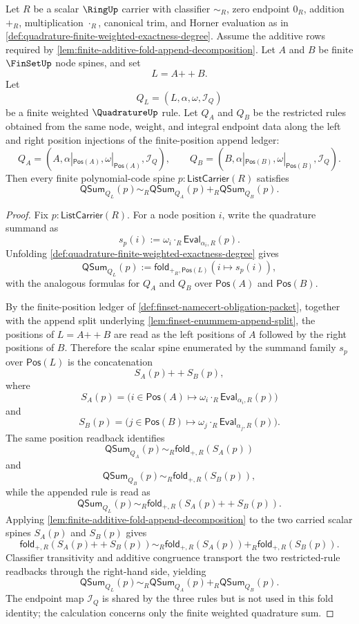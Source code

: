\begin{theorem}
\label{thm:quadrature-node-list-append-sum-decomposition}
Let $R$ be a scalar $\RingUp$ carrier with classifier $\sim_R$, zero endpoint $0_R$, addition $+_R$, multiplication $\cdot_R$, canonical trim, and Horner evaluation as in \autoref{def:quadrature-finite-weighted-exactness-degree}. Assume the additive rows required by \autoref{lem:finite-additive-fold-append-decomposition}. Let $A$ and $B$ be finite $\FinSetUp$ node spines, and set
$$
L=A{++}B.
$$
Let
$$
Q_L=(L,\alpha,\omega,\mathcal I_Q)
$$
be a finite weighted $\QuadratureUp$ rule. Let $Q_A$ and $Q_B$ be the restricted rules obtained from the same node, weight, and integral endpoint data along the left and right position injections of the finite-position append ledger:
$$
Q_A=(A,\alpha|_{\mathsf{Pos}(A)},\omega|_{\mathsf{Pos}(A)},\mathcal I_Q),
\qquad
Q_B=(B,\alpha|_{\mathsf{Pos}(B)},\omega|_{\mathsf{Pos}(B)},\mathcal I_Q).
$$
Then every finite polynomial-code spine $p:\mathsf{ListCarrier}(R)$ satisfies
$$
\mathsf{QSum}_{Q_L}(p)
\sim_R
\mathsf{QSum}_{Q_A}(p)+_R\mathsf{QSum}_{Q_B}(p).
$$
\end{theorem}
\begin{proof}
Fix $p:\mathsf{ListCarrier}(R)$. For a node position $i$, write the quadrature summand as
$$
s_p(i):=\omega_i\cdot_R\mathsf{Eval}_{\alpha_i,R}(p).
$$
Unfolding \autoref{def:quadrature-finite-weighted-exactness-degree} gives
$$
\mathsf{QSum}_{Q_L}(p)
:=
\mathsf{fold}_{+_R,\mathsf{Pos}(L)}(i\mapsto s_p(i)),
$$
with the analogous formulas for $Q_A$ and $Q_B$ over $\mathsf{Pos}(A)$ and $\mathsf{Pos}(B)$.

By the finite-position ledger of \autoref{def:finset-namecert-obligation-packet}, together with the append split underlying \autoref{lem:finset-enummem-append-split}, the positions of $L=A{++}B$ are read as the left positions of $A$ followed by the right positions of $B$. Therefore the scalar spine enumerated by the summand family $s_p$ over $\mathsf{Pos}(L)$ is the concatenation
$$
S_A(p){++}S_B(p),
$$
where
$$
S_A(p)=\bigl(i\in\mathsf{Pos}(A)\mapsto
\omega_i\cdot_R\mathsf{Eval}_{\alpha_i,R}(p)\bigr)
$$
and
$$
S_B(p)=\bigl(j\in\mathsf{Pos}(B)\mapsto
\omega_j\cdot_R\mathsf{Eval}_{\alpha_j,R}(p)\bigr).
$$
The same position readback identifies
$$
\mathsf{QSum}_{Q_A}(p)
\sim_R
\mathsf{fold}_{+,R}(S_A(p))
$$
and
$$
\mathsf{QSum}_{Q_B}(p)
\sim_R
\mathsf{fold}_{+,R}(S_B(p)),
$$
while the appended rule is read as
$$
\mathsf{QSum}_{Q_L}(p)
\sim_R
\mathsf{fold}_{+,R}(S_A(p){++}S_B(p)).
$$
Applying \autoref{lem:finite-additive-fold-append-decomposition} to the two carried scalar spines $S_A(p)$ and $S_B(p)$ gives
$$
\mathsf{fold}_{+,R}(S_A(p){++}S_B(p))
\sim_R
\mathsf{fold}_{+,R}(S_A(p))+_R\mathsf{fold}_{+,R}(S_B(p)).
$$
Classifier transitivity and additive congruence transport the two restricted-rule readbacks through the right-hand side, yielding
$$
\mathsf{QSum}_{Q_L}(p)
\sim_R
\mathsf{QSum}_{Q_A}(p)+_R\mathsf{QSum}_{Q_B}(p).
$$
The endpoint map $\mathcal I_Q$ is shared by the three rules but is not used in this fold identity; the calculation concerns only the finite weighted quadrature sum.
\end{proof}

